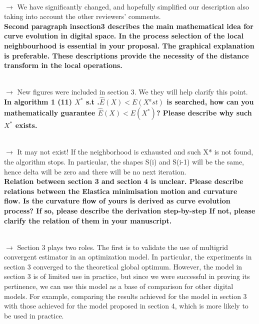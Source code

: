 \documentclass[12pt]{article}
\begin{document}
~\\
$\rightarrow$ We have significantly changed, and hopefully simplified our description also taking into account the
other reviewers' comments.
~\\


\textbf{Second paragraph insection3 describes the main mathematical idea for curve evolution in digital space. In the process selection of the local neighbourhood is essential in your proposal. The graphical explanation is preferable. These descriptions provide the necessity of the distance transform in the local operations.}

~\\
$\rightarrow$ New figures were included in section 3. We they will help clarify this point.
~\\


\textbf{In algorithm 1 (11) $X^\ast$ s.t .$\hat{E}(X)< E(X^ast)$ is searched, how can you mathematically guarantee $\hat{E}(X)< E(X^\ast)$? Please describe why such $X^{\ast}$ exists.}

~\\
$\rightarrow$ It may not exist! If the neighborhood is exhausted and such X* is not found, the algorithm stops. In particular, the shapes S(i) and S(i-1) will be the same, hence delta will be zero and there will be no next iteration.
~\\


\textbf{Relation between section 3 and section 4 is unclear.
Please describe relations between the Elastica minimisation motion and curvature flow.
Is the curvature flow of yours is derived as curve evolution process?
If so, please describe the derivation step-by-step
If not, please clarify the relation of them in your manuscript.}

~\\
$\rightarrow$ Section 3 plays two roles. The first is to validate the use of multigrid convergent estimator in an optimization model. In particular, the experiments in section 3 converged to the theoretical global optimum. However, the model in section 3 is of limited use in practice, but since we were successful in proving its pertinence, we can use this model as a base of comparison for other digital models. For example, comparing the results achieved for the model in section 3 with those achieved for the model proposed in section 4, which is more likely to be used in practice.
~\\




\end{document}
